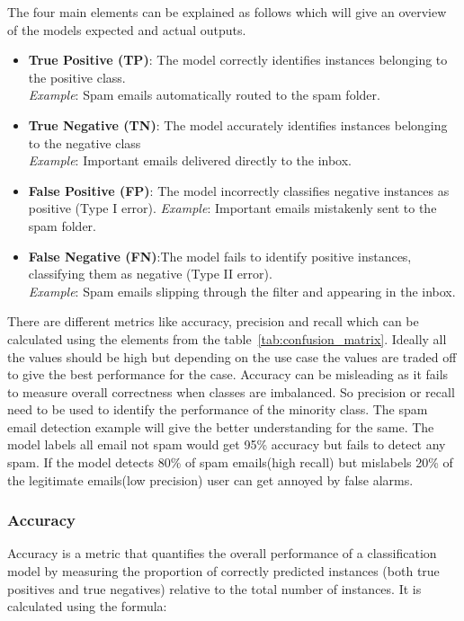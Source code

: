   The four main elements can be explained as follows which will give an overview of the models expected and actual outputs.
  \begin{itemize}
    \item \textbf{True Positive (TP)}:  The model correctly identifies instances belonging to the positive class. \\
      \textit{Example}: Spam emails automatically routed to the spam folder.

      \item \textbf{True Negative (TN)}: The model accurately identifies instances belonging to the negative class \\
      \textit{Example}: Important emails delivered directly to the inbox.
  
        \item \textbf{False Positive (FP)}: The model incorrectly classifies negative instances as positive (Type I error).
      \textit{Example}: Important emails mistakenly sent to the spam folder.
  
    \item \textbf{False Negative (FN)}:The model fails to identify positive instances, classifying them as negative (Type II error). \\
      \textit{Example}: Spam emails slipping through the filter and appearing in the inbox.
  
  \end{itemize}

  There are different metrics like accuracy, precision and recall which can be calculated using the elements from the table~\ref{tab:confusion_matrix}. Ideally all the values should be high but depending on the use case the values are traded off to give the best performance for the case. Accuracy can be misleading as it fails to measure overall correctness when classes are imbalanced. So precision or recall need to be used to identify the performance of the minority class. The spam email detection example will give the better understanding for the same. The model labels all email not spam would get 95\% accuracy but fails to detect any spam. If the model detects 80\% of spam emails(high recall) but mislabels 20\% of the legitimate emails(low precision) user can get annoyed by false alarms. 

  \subsubsection{Accuracy}
  Accuracy is a metric that quantifies the overall performance of a classification model by measuring the proportion of correctly predicted instances (both true positives and true negatives) relative to the total number of instances. It is calculated using the formula:

